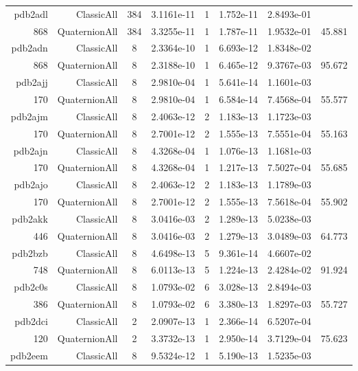 \begin{xltabular}{\textwidth}{r|rcS[table-format=1.4e+2]cS[table-format=1.3e+2]S[table-format=1.4e+2]S[table-format=-1.3]}
pdb2adl & ClassicAll & 384 & 3.1161e-11 & 1 & 1.752e-11 & 2.8493e-01 & \\
868 & QuaternionAll & 384 & 3.3255e-11 & 1 & 1.787e-11 & 1.9532e-01 & 45.881\\  \addlinespace
pdb2adn & ClassicAll & 8 & 2.3364e-10 & 1 & 6.693e-12 & 1.8348e-02 & \\
868 & QuaternionAll & 8 & 2.3188e-10 & 1 & 6.465e-12 & 9.3767e-03 & 95.672\\  \addlinespace
pdb2ajj & ClassicAll & 8 & 2.9810e-04 & 1 & 5.641e-14 & 1.1601e-03 & \\
170 & QuaternionAll & 8 & 2.9810e-04 & 1 & 6.584e-14 & 7.4568e-04 & 55.577\\  \addlinespace
pdb2ajm & ClassicAll & 8 & 2.4063e-12 & 2 & 1.183e-13 & 1.1723e-03 & \\
170 & QuaternionAll & 8 & 2.7001e-12 & 2 & 1.555e-13 & 7.5551e-04 & 55.163\\  \addlinespace
pdb2ajn & ClassicAll & 8 & 4.3268e-04 & 1 & 1.076e-13 & 1.1681e-03 & \\
170 & QuaternionAll & 8 & 4.3268e-04 & 1 & 1.217e-13 & 7.5027e-04 & 55.685\\  \addlinespace
pdb2ajo & ClassicAll & 8 & 2.4063e-12 & 2 & 1.183e-13 & 1.1789e-03 & \\
170 & QuaternionAll & 8 & 2.7001e-12 & 2 & 1.555e-13 & 7.5618e-04 & 55.902\\  \addlinespace
pdb2akk & ClassicAll & 8 & 3.0416e-03 & 2 & 1.289e-13 & 5.0238e-03 & \\
446 & QuaternionAll & 8 & 3.0416e-03 & 2 & 1.279e-13 & 3.0489e-03 & 64.773\\  \addlinespace
pdb2bzb & ClassicAll & 8 & 4.6498e-13 & 5 & 9.361e-14 & 4.6607e-02 & \\
748 & QuaternionAll & 8 & 6.0113e-13 & 5 & 1.224e-13 & 2.4284e-02 & 91.924\\  \addlinespace
pdb2c0s & ClassicAll & 8 & 1.0793e-02 & 6 & 3.028e-13 & 2.8494e-03 & \\
386 & QuaternionAll & 8 & 1.0793e-02 & 6 & 3.380e-13 & 1.8297e-03 & 55.727\\  \addlinespace
pdb2dci & ClassicAll & 2 & 2.0907e-13 & 1 & 2.366e-14 & 6.5207e-04 & \\
120 & QuaternionAll & 2 & 3.3732e-13 & 1 & 2.950e-14 & 3.7129e-04 & 75.623\\  \addlinespace
pdb2eem & ClassicAll & 8 & 9.5324e-12 & 1 & 5.190e-13 & 1.5235e-03 & \\

\end{xltabular}
